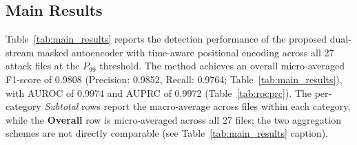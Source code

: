 \begin{table}[!htbp]
\centering
\caption{Architecture and training hyperparameters used for the proposed method.}
\label{tab:hyperparams}
\footnotesize
{}
\end{table}

\subsection{Main Results}
\label{sec:main_results}
Table~\ref{tab:main_results} reports the detection performance of the proposed dual-stream masked autoencoder with time-aware positional encoding across all 27 attack files at the $P_{99}$ threshold. The method achieves an overall micro-averaged F1-score of 0.9808 (Precision: 0.9852, Recall: 0.9764; Table~\ref{tab:main_results}), with AUROC of 0.9974 and AUPRC of 0.9972 (Table~\ref{tab:rocprc}). The per-category \emph{Subtotal} rows report the macro-average across files within each category, while the \textbf{Overall} row is micro-averaged across all 27 files; the two aggregation schemes are not directly comparable (see Table~\ref{tab:main_results} caption).

